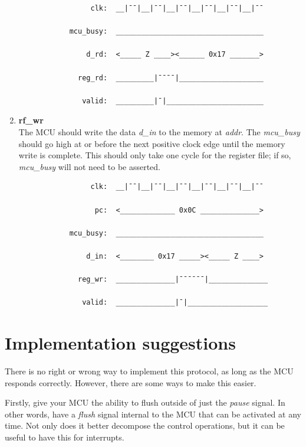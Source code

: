 \documentclass[10pt,a4paper]{article}
\begin{document}
\begin{enumerate}
        \begin{verbatim}
                 clk:  __|¯¯|__|¯¯|__|¯¯|__|¯¯|__|¯¯|__|¯¯

            mcu_busy:  ___________________________________

                d_rd:  <_____ Z ____><______ 0x17 _______>

              reg_rd:  _________|¯¯¯¯|____________________

               valid:  _________|¯|_______________________
        \end{verbatim}

    \item\textbf{rf\_wr}\\
    The MCU should write the data \emph{d\_in} to the memory at \emph{addr}. The \emph{mcu\_busy} 
    should go high at or before the next positive clock edge until the memory write is complete.
    This should only take one cycle for the register file; if so, \emph{mcu\_busy} will not need to
    be asserted.

        \begin{verbatim}
                 clk:  __|¯¯|__|¯¯|__|¯¯|__|¯¯|__|¯¯|__|¯¯

                  pc:  <_____________ 0x0C ______________>

            mcu_busy:  ___________________________________

                d_in:  <________ 0x17 _____><_____ Z ____> 

              reg_wr:  ______________|¯¯¯¯¯¯|______________

               valid:  ______________|¯|___________________
        \end{verbatim}

\end{enumerate}

\newpage
\section{Implementation suggestions}
There is no right or wrong way to implement this protocol, as long as the MCU responds correctly.
However, there are some ways to make this easier.

Firstly, give your MCU the ability to flush outside of just the \emph{pause} signal.
In other words, have a \emph{flush} signal internal to the MCU that can be activated at any time.
Not only does it better decompose the control operations, but it can be useful to have this
for interrupts.
\end{document}

